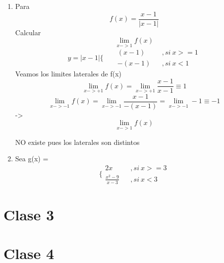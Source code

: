 \documentclass{article}
\begin{document}
            \begin{enumerate}
                \item Para \begin{equation}
                    f(x) = \frac{x-1}{|x-1|}
                \end{equation} Calcular
                \begin{equation}
                    \lim_{x->1} f(x)
                \end{equation} 
                \begin{equation}
                    y=|x-1| \Biggl\{ 
                    \begin{aligned}
                          && (x-1) && ,si\ x>=1 \\ 
                          &&-(x-1) &&,si\ x<1
                    \end{aligned}
                \end{equation} Veamos los limites laterales de f(x)
                \begin{equation}
                    \lim_{x->+1}f(x)=\lim_{x->+1} \frac{x-1}{x-1} \equiv 1
                \end{equation}
                \begin{equation}
                    \lim_{x->-1}f(x)=\lim_{x->-1} \frac{x-1}{-(x-1)} = \lim_{x->-1} -1 \equiv -1
                \end{equation}
                -> \begin{equation}
                    \lim_{x->1} f(x)
                \end{equation} \begin{center}
                    NO existe pues los laterales son distintos
                \end{center}
                \item Sea g(x) = \begin{equation}
                    \biggl\{\begin{aligned}
                        2x && ,si\ x>=3 \\ 
                        \frac{x^2 -9}{x-3} &&,si\ x<3 
                    \end{aligned}
                \end{equation}
            \end{enumerate}
    \section{Clase 3}
    

    \section{Clase 4}
           
          
        
\end{document}
